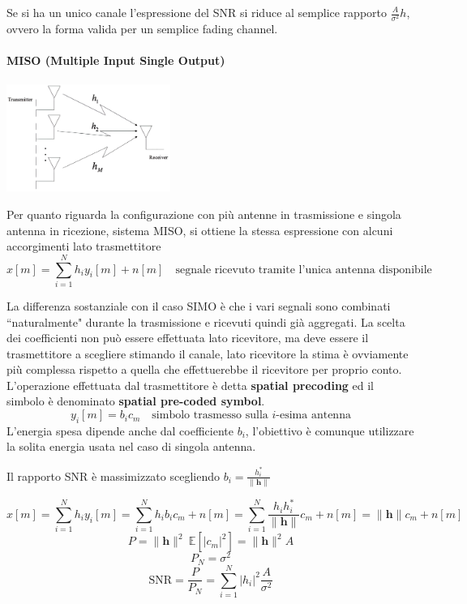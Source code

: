 Se si ha un unico canale l'espressione del SNR si riduce al semplice rapporto $\frac{A}{\sigma^2}h$, ovvero la forma valida per un semplice fading channel.
\paragraph*{MISO (Multiple Input Single Output)}
\begin{center}
    \includegraphics[width=0.4\textwidth]{imgs/miso.jpg}
\end{center}
Per quanto riguarda la configurazione con più antenne in trasmissione e singola antenna in ricezione, sistema MISO, si ottiene la stessa espressione con alcuni accorgimenti lato trasmettitore
\[
    x[m] = \sum_{i=1}^{N} h_i y_i[m] + n[m] \quad \text{segnale ricevuto tramite l'unica antenna disponibile}
\]

La differenza sostanziale con il caso SIMO è che i vari segnali sono combinati ``naturalmente" durante la trasmissione e ricevuti quindi già aggregati. 
La scelta dei coefficienti non può essere effettuata lato ricevitore, ma deve essere il trasmettitore a scegliere stimando il canale, lato ricevitore la stima è ovviamente più complessa rispetto a quella che effettuerebbe il ricevitore per proprio conto.
L'operazione effettuata dal trasmettitore è detta \textbf{spatial precoding} ed il simbolo è denominato \textbf{spatial pre-coded symbol}.
\[
    y_i[m] = b_i c_m \quad \text{simbolo trasmesso sulla $i$-esima antenna}
\]
L'energia spesa dipende anche dal coefficiente $b_i$, l'obiettivo è comunque utilizzare la solita energia usata nel caso di singola antenna.

Il rapporto SNR è massimizzato scegliendo $b_i = \frac{h_i^*}{ \| \mathbf{h} \| }$

\[
    x[m] = \sum_{i=1}^{N} h_i y_i[m]  = \sum_{i=1}^{N} h_i b_i c_m + n[m] = \sum_{i=1}^{N} \frac{h_i h_i^*}{\| \mathbf{h} \|} c_m + n[m] = \| \mathbf{h} \| c_m + n[m]
\]
\[
    P = \|\mathbf{h} \|^2 \ \mathbb{E} \left[\left| c_m \right|^2 \right] = \|\mathbf{h} \|^2  A
\]
\[
    P_N = \sigma^2  
\]
\[
    \text{SNR} = \frac{P}{P_N} = \sum_{i=1}^{N} |h_i|^2 \frac{A}{\sigma^2}    
\]

